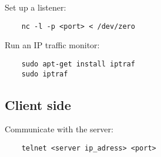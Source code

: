 \documentclass[11pt]{article}
\begin{document}
Set up a listener: 
\begin{verbatim}
    nc -l -p <port> < /dev/zero
\end{verbatim}

Run an IP traffic monitor:
\begin{verbatim}
    sudo apt-get install iptraf
    sudo iptraf
\end{verbatim}




\subsection{Client side}
\label{sec:org2dd475e}

Communicate with the server:
\begin{verbatim}
    telnet <server ip_adress> <port>
\end{verbatim}
\end{document}
